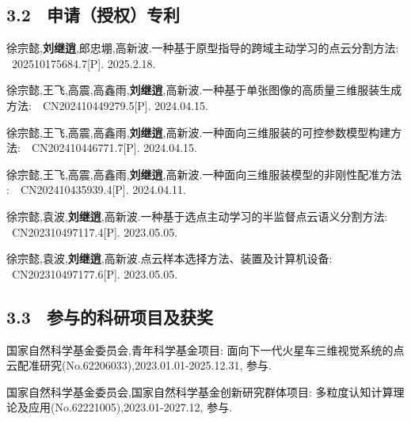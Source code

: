 \subsection{3.2 \ 申请（授权）专利}
\vspace{-0.1cm}
\noindent [1]
\begin{minipage}[t]{0.96\linewidth}
徐宗懿,\textbf{刘继逍},郎忠堋,高新波.一种基于原型指导的跨域主动学习的点云分割方法$:$ \ 202510175684.7[P]. 2025.2.18.
\end{minipage}
\noindent [2]
\begin{minipage}[t]{0.96\linewidth}
徐宗懿,王飞,高震,高鑫雨,\textbf{刘继逍},高新波.一种基于单张图像的高质量三维服装生成方法$:$ \ CN202410449279.5[P]. 2024.04.15.
\end{minipage}
\noindent [3]
\begin{minipage}[t]{0.96\linewidth}
徐宗懿,王飞,高震,高鑫雨,\textbf{刘继逍},高新波.一种面向三维服装的可控参数模型构建方法$:$ \ CN202410446771.7[P]. 2024.04.15.
\end{minipage}
\noindent [4]
\begin{minipage}[t]{0.96\linewidth}
徐宗懿,王飞,高震,高鑫雨,\textbf{刘继逍},高新波.一种面向三维服装模型的非刚性配准方法$:$ \ CN202410435939.4[P]. 2024.04.11. 
\end{minipage}
\noindent [5]
\begin{minipage}[t]{0.96\linewidth}
徐宗懿,袁波,\textbf{刘继逍},高新波.一种基于选点主动学习的半监督点云语义分割方法$:$ \ CN202310497117.4[P]. 2023.05.05.
\end{minipage}
\noindent [6]
\begin{minipage}[t]{0.96\linewidth}
徐宗懿,袁波,\textbf{刘继逍},高新波.点云样本选择方法、装置及计算机设备$:$ \ CN202310497177.6[P]. 2023.05.05.
\end{minipage}

\subsection{3.3 \ 参与的科研项目及获奖}
\vspace{-0.1cm}
\noindent [1]
\begin{minipage}[t]{0.96\linewidth}
    国家自然科学基金委员会,青年科学基金项目: 面向下一代火星车三维视觉系统的点云配准研究(No.62206033),2023.01.01-2025.12.31, 参与.
\end{minipage}
\noindent [2]
\begin{minipage}[t]{0.96\linewidth}
    国家自然科学基金委员会,国家自然科学基金创新研究群体项目: 多粒度认知计算理论及应用(No.62221005),2023.01-2027.12, 参与.
\end{minipage}